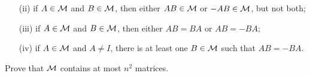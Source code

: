 \documentclass[amssymb,twocolumn,pra,10pt,aps]{revtex4-1}
\begin{document}
\begin{itemize}
\begin{itemize}
\item[(ii)] if $A \in {\mathcal{M}}$ and $B \in {\mathcal{M}}$, then either $AB \in {\mathcal{M}}$ or
$-AB \in {\mathcal{M}}$, but not both;

\item[(iii)] if $A \in {\mathcal{M}}$ and $B \in {\mathcal{M}}$, then either $AB = BA$ or
$AB = -BA$;

\item[(iv)] if $A \in {\mathcal{M}}$ and $A \neq I$, there is at least one $B \in
{\mathcal{M}}$ such that $AB = - BA$.
\end{itemize}
Prove that ${\mathcal{M}}$ contains at most $n^2$ matrices.
\end{itemize}
\end{document}

